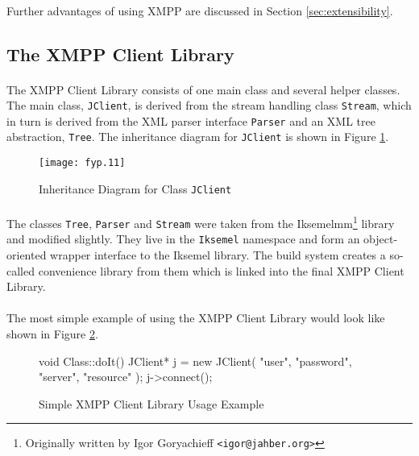 \paragraph{}
Further advantages of using XMPP are discussed in Section \ref{sec:extensibility}.

\subsection{The XMPP Client Library}
\label{sec:clientlib}
\paragraph{}
The XMPP Client Library consists of one main class and several helper classes. The main class, \texttt{JClient}, is derived from the stream handling class \texttt{Stream}, which in turn is derived from the XML parser interface \texttt{Parser} and an XML tree abstraction, \texttt{Tree}. The inheritance diagram for \texttt{JClient} is shown in Figure \ref{fig:inhjclient}.

\begin{figure}[H]
\begin{center}
\texttt{[image: fyp.11]}
\end{center}
\caption{Inheritance Diagram for Class \texttt{JClient}}
\label{fig:inhjclient}
\end{figure}

\paragraph{}
The classes \texttt{Tree}, \texttt{Parser} and \texttt{Stream} were taken from the Iksemelmm\footnote{Originally written by Igor Goryachieff \texttt{<igor@jahber.org>}} library and modified slightly. They live in the \texttt{Iksemel} namespace and form an object-oriented wrapper interface to the Iksemel library. The build system creates a so-called convenience library from them which is linked into the final XMPP Client Library.

\paragraph{}
The most simple example of using the XMPP Client Library would look like shown in Figure \ref{fig:usageExample}.

\begin{figure}[H]
\begin{listing}{1}
void Class::doIt()
{
  JClient* j = new JClient( "user", "password",
                            "server", "resource" );
  j->connect();
}
\end{listing}
\caption{Simple XMPP Client Library Usage Example}
\label{fig:usageExample}
\end{figure}

